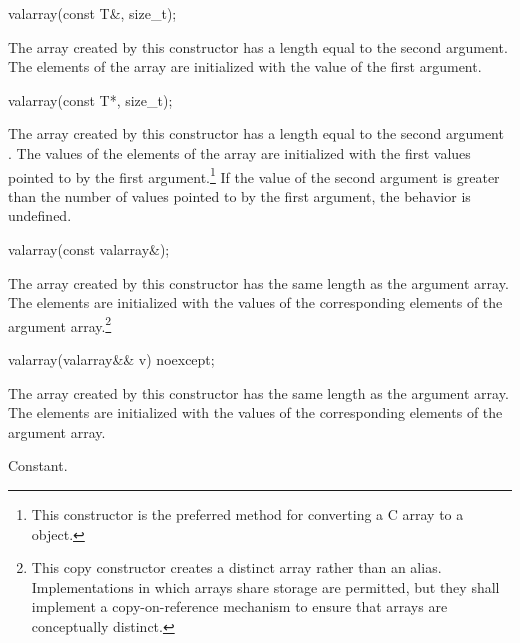 %
\begin{itemdecl}
valarray(const T&, size_t);
\end{itemdecl}

\begin{itemdescr}
\pnum
The array created by this constructor has a length equal to the second
argument.
The elements of the array are initialized with the value of the first argument.
\end{itemdescr}

%
\begin{itemdecl}
valarray(const T*, size_t);
\end{itemdecl}

\begin{itemdescr}
\pnum
The array created by this constructor has a length equal to the second
argument
.
The values of the elements of the array are initialized with the
first
values pointed to by the first argument.\footnote{This constructor is the
preferred method for converting a C array to a
object.}
If the value of the second argument is greater than the number of values
pointed to by the first argument, the behavior is undefined.%
\end{itemdescr}

%
\begin{itemdecl}
valarray(const valarray&);
\end{itemdecl}

\begin{itemdescr}
\pnum
The array created by this constructor has the same length as the argument
array.
The elements are initialized with the values of the corresponding
elements of the argument array.\footnote{This copy constructor creates
a distinct array rather than an alias.
Implementations in which arrays share storage are permitted, but they
shall implement a copy-on-reference mechanism to ensure that arrays are
conceptually distinct.}
\end{itemdescr}

%
\begin{itemdecl}
valarray(valarray&& v) noexcept;
\end{itemdecl}

\begin{itemdescr}
\pnum
The array created by this constructor has the same length as the argument
array.
The elements are initialized with the values of the corresponding
elements of the argument array.

\pnum
\complexity Constant.
\end{itemdescr}


